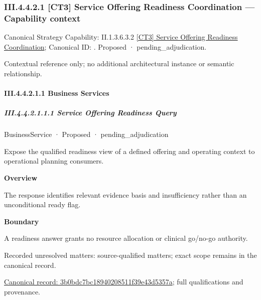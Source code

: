 \subsubsection*{III.4.4.2.1 [CT3] Service Offering Readiness Coordination — Capability context}
\label{navigation:III.4.4.2.1}

{\small Canonical Strategy Capability: II.1.3.6.3.2 \hyperref[element:0caecaba5d3e4781b8671b12c13ee283]{[CT3] Service Offering Readiness Coordination}; Canonical ID: \texttt{}. Proposed · pending\_adjudication.}\par
Contextual reference only; no additional architectural instance or semantic relationship.\par
\paragraph*{III.4.4.2.1.1 Business Services}
\label{navigation:III.4.4.2.1.1}

\subparagraph*{III.4.4.2.1.1.1 Service Offering Readiness Query}
\label{navigation:III.4.4.2.1.1.1}

\label{element:3b0bdc7bc18940208511f39e43d5357a}
{\small BusinessService · Proposed · pending\_adjudication}\par

Expose the qualified readiness view of a defined offering and operating context to operational planning consumers.



\textbf{Overview}



The response identifies relevant evidence basis and insufficiency rather than an unconditional ready flag.



\textbf{Boundary}



A readiness answer grants no resource allocation or clinical go/no-go authority.


{\small Recorded unresolved matters: source-qualified matters; exact scope remains in the canonical record.}\par
{\footnotesize \href{../../../../../../../continuum/business/business-service/3b0bdc7bc18940208511f39e43d5357a.md}{Canonical record: 3b0bdc7bc18940208511f39e43d5357a}; full qualifications and provenance.}\par
